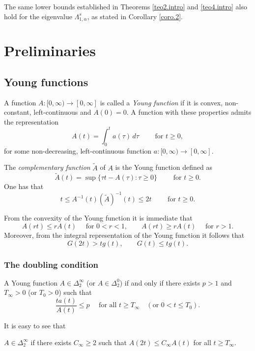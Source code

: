 \documentclass[12pt,reqno]{amsart}
\theoremstyle{definition}
\theoremstyle{remark}
\numberwithin{equation}{section}
\begin{document}
The same lower bounds established  in Theorems \ref{teo2.intro} and \ref{teo4.intro} also hold for the eigenvalue $\Lambda_{1,\alpha}^s$, as stated in Corollary \ref{coro.2}.
 
 

\section{Preliminaries}

\subsection{Young functions} \label{sec.young}
A function $A\colon [0,\infty)\to [0,\infty]$ is called a \emph{Young function} if it is convex, non-constant, left-continuous and $A(0)=0$. A function with these properties admits the representation 
$$
A(t)=\int_0^t a(\tau)\,d\tau \qquad \text{ for } t\geq 0,
$$
for some non-decreasing, left-continuous function $a\colon[0,\infty)\to [0,\infty]$. 

The \emph{complementary function} $\tilde A$ of $A$ is the Young function defined as
$$
\tilde A (t)= \sup\{ \tau t-A(\tau)\colon \tau \geq 0\} \qquad \text{ for } t\geq 0.
$$
One has that
$$
t \leq A^{-1}(t) (\tilde A)^{-1}(t) \le 2t \qquad \text{ for } t\geq 0.
$$

\noindent From the convexity of the Young function it is immediate that
\begin{equation} \label{prop.conv}
A(rt)\leq r A(t)\quad  \text { for } 0<r<1, \qquad 
A(rt)\geq r A(t)\quad  \text { for } r>1.
\end{equation}
Moreover, from the integral representation of the Young function it follows that
$$
G(2t) > tg(t), \qquad G(t)\leq t g(t).
$$

\subsubsection{The doubling condition}
A Young function $A\in \Delta_2^\infty$ (or $A\in \Delta_2^0$) if and only if there exists $p>1$ and $T_\infty>0$ (or $T_0>0$) such that
\begin{equation} \label{cte.p}
\frac{ta(t)}{A(t)} \leq p \quad \text{ for all } t\geq T_\infty \quad (\text{or } 0<t\leq T_0).
\end{equation}

\noindent It is easy to see that 

\noindent $A\in \Delta_2^\infty$ if there exists $C_\infty\geq 2$ such that $A(2t)\le C_\infty A(t)$ for all $t\geq T_\infty$.
\end{document}
